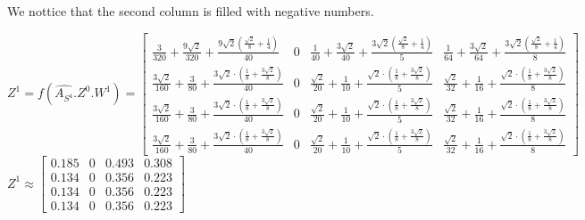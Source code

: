 \documentclass[a4paper]{article}
\begin{document}
We nottice that the second column is filled with negative numbers.

$Z^{1} = f(\hat{A_{S^4}}.Z^{0}. W^{1}) =  \left[\begin{matrix}\frac{3}{320} + \frac{9 \sqrt{2}}{320} + \frac{9 \sqrt{2} \left(\frac{\sqrt{2}}{8} + \frac{1}{4}\right)}{40} & 0 & \frac{1}{40} + \frac{3 \sqrt{2}}{40} + \frac{3 \sqrt{2} \left(\frac{\sqrt{2}}{8} + \frac{1}{4}\right)}{5} & \frac{1}{64} + \frac{3 \sqrt{2}}{64} + \frac{3 \sqrt{2} \left(\frac{\sqrt{2}}{8} + \frac{1}{4}\right)}{8}\\\frac{3 \sqrt{2}}{160} + \frac{3}{80} + \frac{3 \sqrt{2} \cdot \left(\frac{1}{8} + \frac{3 \sqrt{2}}{8}\right)}{40} & 0 & \frac{\sqrt{2}}{20} + \frac{1}{10} + \frac{\sqrt{2} \cdot \left(\frac{1}{8} + \frac{3 \sqrt{2}}{8}\right)}{5} & \frac{\sqrt{2}}{32} + \frac{1}{16} + \frac{\sqrt{2} \cdot \left(\frac{1}{8} + \frac{3 \sqrt{2}}{8}\right)}{8}\\\frac{3 \sqrt{2}}{160} + \frac{3}{80} + \frac{3 \sqrt{2} \cdot \left(\frac{1}{8} + \frac{3 \sqrt{2}}{8}\right)}{40} & 0 & \frac{\sqrt{2}}{20} + \frac{1}{10} + \frac{\sqrt{2} \cdot \left(\frac{1}{8} + \frac{3 \sqrt{2}}{8}\right)}{5} & \frac{\sqrt{2}}{32} + \frac{1}{16} + \frac{\sqrt{2} \cdot \left(\frac{1}{8} + \frac{3 \sqrt{2}}{8}\right)}{8}\\\frac{3 \sqrt{2}}{160} + \frac{3}{80} + \frac{3 \sqrt{2} \cdot \left(\frac{1}{8} + \frac{3 \sqrt{2}}{8}\right)}{40} & 0 & \frac{\sqrt{2}}{20} + \frac{1}{10} + \frac{\sqrt{2} \cdot \left(\frac{1}{8} + \frac{3 \sqrt{2}}{8}\right)}{5} & \frac{\sqrt{2}}{32} + \frac{1}{16} + \frac{\sqrt{2} \cdot \left(\frac{1}{8} + \frac{3 \sqrt{2}}{8}\right)}{8}\end{matrix}\right]$
$Z^{1}  \approx \begin{bmatrix}
    0.185 &  0 &  0.493 &  0.308\\
    0.134 &  0 &  0.356 &  0.223\\
    0.134 &  0 &  0.356 &  0.223\\
    0.134 &  0 &  0.356 &  0.223
\end{bmatrix}$

% 
\end{document}
